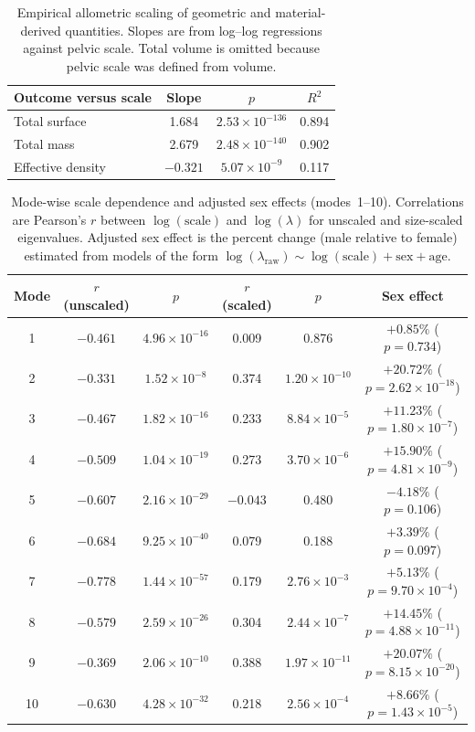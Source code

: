 \documentclass[openacc]{rsproca_new}
\begin{document}
\begin{table}[p]
\centering
\caption{Empirical allometric scaling of geometric and material-derived quantities. Slopes are from log--log regressions against pelvic scale. Total volume is omitted because pelvic scale was defined from volume.}
\label{tab:allometry}
\begin{tabular}{lccc}
\toprule
Outcome versus scale & Slope & $p$ & $R^2$ \\
\midrule
Total surface & 1.684 & $2.53 \times 10^{-136}$ & 0.894 \\
Total mass & 2.679 & $2.48 \times 10^{-140}$ & 0.902 \\
Effective density & $-0.321$ & $5.07 \times 10^{-9}$ & 0.117 \\
\bottomrule
\end{tabular}
\end{table}

\begin{table}[p]
\centering
\caption{Mode-wise scale dependence and adjusted sex effects (modes~1--10). Correlations are Pearson's $r$ between $\log(\mathrm{scale})$ and $\log(\lambda)$ for unscaled and size-scaled eigenvalues. Adjusted sex effect is the percent change (male relative to female) estimated from models of the form $\log(\lambda_{\mathrm{raw}}) \sim \log(\mathrm{scale}) + \mathrm{sex} + \mathrm{age}$.}
\label{tab:modes}
\begin{tabular}{cccccc}
\toprule
Mode & $r$ (unscaled) & $p$ & $r$ (scaled) & $p$ & Sex effect \\
\midrule
1  & $-0.461$ & $4.96 \times 10^{-16}$ & 0.009 & 0.876 & $+0.85\%$ ($p=0.734$) \\
2  & $-0.331$ & $1.52 \times 10^{-8}$  & 0.374 & $1.20 \times 10^{-10}$ & $+20.72\%$ ($p=2.62 \times 10^{-18}$) \\
3  & $-0.467$ & $1.82 \times 10^{-16}$ & 0.233 & $8.84 \times 10^{-5}$  & $+11.23\%$ ($p=1.80 \times 10^{-7}$) \\
4  & $-0.509$ & $1.04 \times 10^{-19}$ & 0.273 & $3.70 \times 10^{-6}$  & $+15.90\%$ ($p=4.81 \times 10^{-9}$) \\
5  & $-0.607$ & $2.16 \times 10^{-29}$ & $-0.043$ & 0.480 & $-4.18\%$ ($p=0.106$) \\
6  & $-0.684$ & $9.25 \times 10^{-40}$ & 0.079 & 0.188 & $+3.39\%$ ($p=0.097$) \\
7  & $-0.778$ & $1.44 \times 10^{-57}$ & 0.179 & $2.76 \times 10^{-3}$  & $+5.13\%$ ($p=9.70 \times 10^{-4}$) \\
8  & $-0.579$ & $2.59 \times 10^{-26}$ & 0.304 & $2.44 \times 10^{-7}$  & $+14.45\%$ ($p=4.88 \times 10^{-11}$) \\
9  & $-0.369$ & $2.06 \times 10^{-10}$ & 0.388 & $1.97 \times 10^{-11}$ & $+20.07\%$ ($p=8.15 \times 10^{-20}$) \\
10 & $-0.630$ & $4.28 \times 10^{-32}$ & 0.218 & $2.56 \times 10^{-4}$  & $+8.66\%$ ($p=1.43 \times 10^{-5}$) \\
\bottomrule
\end{tabular}
\end{table}
\end{document}
